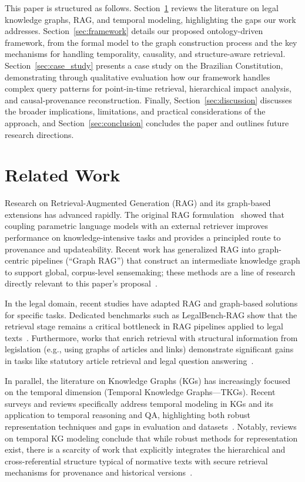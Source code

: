 \documentclass[11pt]{article}
\begin{document}
This paper is structured as follows. Section~\ref{sec:related_work} reviews the literature on legal knowledge graphs, RAG, and temporal modeling, highlighting the gaps our work addresses. Section~\ref{sec:framework} details our proposed ontology-driven framework, from the formal model to the graph construction process and the key mechanisms for handling temporality, causality, and structure-aware retrieval. Section~\ref{sec:case_study} presents a case study on the Brazilian Constitution, demonstrating through qualitative evaluation how our framework handles complex query patterns for point-in-time retrieval, hierarchical impact analysis, and causal-provenance reconstruction. Finally, Section~\ref{sec:discussion} discusses the broader implications, limitations, and practical considerations of the approach, and Section~\ref{sec:conclusion} concludes the paper and outlines future research directions.

\section{Related Work}
\label{sec:related_work}

Research on Retrieval-Augmented Generation (RAG) and its graph-based extensions has advanced rapidly. The original RAG formulation~\cite{lewis2020rag} showed that coupling parametric language models with an external retriever improves performance on knowledge-intensive tasks and provides a principled route to provenance and updateability. Recent work has generalized RAG into graph-centric pipelines (``Graph RAG'') that construct an intermediate knowledge graph to support global, corpus-level sensemaking; these methods are a line of research directly relevant to this paper's proposal~\cite{edge2024graphrag}.

In the legal domain, recent studies have adapted RAG and graph-based solutions for specific tasks. Dedicated benchmarks such as LegalBench-RAG show that the retrieval stage remains a critical bottleneck in RAG pipelines applied to legal texts~\cite{pipitone2024legalbenchrag}. Furthermore, works that enrich retrieval with structural information from legislation (e.g., using graphs of articles and links) demonstrate significant gains in tasks like statutory article retrieval and legal question answering~\cite{louis2023finding, hei2024heterogeneous, ho2025fairuse}.

In parallel, the literature on Knowledge Graphs (KGs) has increasingly focused on the temporal dimension (Temporal Knowledge Graphs—TKGs). Recent surveys and reviews specifically address temporal modeling in KGs and its application to temporal reasoning and QA, highlighting both robust representation techniques and gaps in evaluation and datasets~\cite{cai2024survey}. Notably, reviews on temporal KG modeling conclude that while robust methods for representation exist, there is a scarcity of work that explicitly integrates the hierarchical and cross-referential structure typical of normative texts with secure retrieval mechanisms for provenance and historical versions~\cite{hooshafza2022temporal}.
\end{document}
